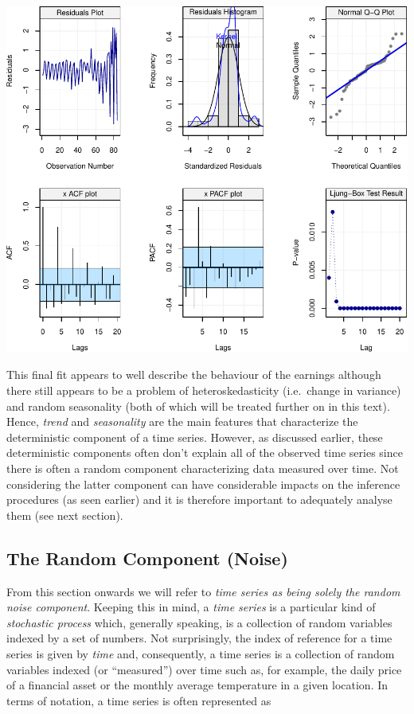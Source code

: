 \documentclass[]{book}
\theoremstyle{definition}
\theoremstyle{definition}
\theoremstyle{definition}
\theoremstyle{remark}
\begin{document}
\begin{center}\includegraphics{ts_files/figure-latex/lmresid3-1} \end{center}

This final fit appears to well describe the behaviour of the earnings
although there still appears to be a problem of heteroskedasticity
(i.e.~change in variance) and random seasonality (both of which will be
treated further on in this text). Hence, \emph{trend} and
\emph{seasonality} are the main features that characterize the
deterministic component of a time series. However, as discussed earlier,
these deterministic components often don't explain all of the observed
time series since there is often a random component characterizing data
measured over time. Not considering the latter component can have
considerable impacts on the inference procedures (as seen earlier) and
it is therefore important to adequately analyse them (see next section).

\hypertarget{the-random-component-noise}{%
\subsection{The Random Component
(Noise)}\label{the-random-component-noise}}

From this section onwards we will refer to \emph{time series as being
solely the random noise component}. Keeping this in mind, a \emph{time
series} is a particular kind of \emph{stochastic process} which,
generally speaking, is a collection of random variables indexed by a set
of numbers. Not surprisingly, the index of reference for a time series
is given by \emph{time} and, consequently, a time series is a collection
of random variables indexed (or ``measured'') over time such as, for
example, the daily price of a financial asset or the monthly average
temperature in a given location. In terms of notation, a time series is
often represented as
\end{document}
